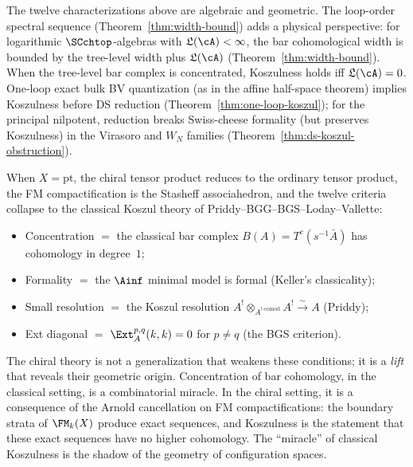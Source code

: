 \begin{remark}
The twelve characterizations above are algebraic and geometric. The
loop-order spectral sequence
(Theorem~\ref{thm:width-bound}) adds a physical
perspective: for logarithmic $\SCchtop$-algebras
with $\mathfrak{L}(\cA)<\infty$, the bar
cohomological width is bounded by the tree-level width plus
$\mathfrak{L}(\cA)$ (Theorem~\ref{thm:width-bound}). When
the tree-level bar complex is concentrated, Koszulness holds iff
$\mathfrak{L}(\cA)=0$.
One-loop exact bulk BV quantization (as in the affine half-space
theorem) implies Koszulness before DS reduction
(Theorem~\ref{thm:one-loop-koszul}); for the principal nilpotent,
reduction breaks Swiss-cheese formality (but preserves Koszulness)
in the Virasoro and $W_N$ families
(Theorem~\ref{thm:ds-koszul-obstruction}).
\end{remark}

\begin{remark}
\label{rem:classical-specialization}
When $X = \mathrm{pt}$, the chiral tensor product reduces to the
ordinary tensor product, the FM compactification is the
Stasheff associahedron, and the twelve criteria collapse to
the classical Koszul theory of Priddy--BGG--BGS--Loday--Vallette:
\begin{itemize}
\item Concentration $=$ the classical bar complex
 $B(A) = T^c(s^{-1}\bar{A})$ has cohomology in degree~$1$;
\item Formality $=$ the $\Ainf$ minimal model is formal
 (Keller's classicality);
\item Small resolution $=$ the Koszul resolution
 $A^! \otimes_{A^{!\text{-comod}}} A^!
 \xrightarrow{\sim} A$ (Priddy);
\item Ext diagonal $=$ $\Ext^{p,q}_A(k,k) = 0$ for $p \neq q$
 (the BGS criterion).
\end{itemize}
The chiral theory is not a generalization that weakens these
conditions; it is a \emph{lift} that reveals their geometric origin.
Concentration of bar cohomology, in the classical setting, is a
combinatorial miracle. In the chiral setting, it is a consequence
of the Arnold cancellation on FM compactifications: the boundary
strata of $\FM_k(X)$ produce exact sequences, and Koszulness
is the statement that these exact sequences have no higher
cohomology. The ``miracle'' of classical Koszulness is the shadow
of the geometry of configuration spaces.
\end{remark}

